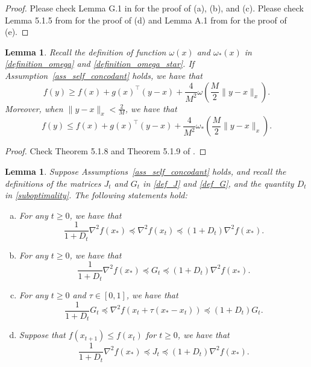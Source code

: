\documentclass[11pt,letterpaper]{article}
\newcommand\0{{\Vector{0}}}
\newcommand\1{{\Vector{1}}}
\newtheorem{lemma}[theorem]{Lemma}
\numberwithin{assumption}{section}
\numberwithin{definition}{section}
\numberwithin{theorem}{section}
\numberwithin{remark}{section}
\begin{document}
\begin{proof}
    Please check Lemma G.1 in \cite{qiujiang2024quasinewton} for the proof of (a), (b), and (c). Please check Lemma 5.1.5 from \cite{convexlecture} for the proof of (d) and Lemma A.1 from \cite{antonglobal} for the proof of (e).
\end{proof}

\begin{lemma}\label{lemma_concordance}
    Recall the definition of function $\omega(x)$ and $\omega_*(x)$ in \eqref{definition_omega} and \eqref{definition_omega_star}. If Assumption~\ref{ass_self_concodant} holds, we have that
    \begin{equation}
        f(y) \geq f(x) + g(x)^\top(y - x) + \frac{4}{M^2}\omega(\frac{M}{2}\|y - x\|_x).
    \end{equation}
    Moreover, when $\|y - x\|_x < \frac{2}{M}$, we have that
    \begin{equation}
        f(y) \leq f(x) + g(x)^\top(y - x) + \frac{4}{M^2}\omega_{*}(\frac{M}{2}\|y - x\|_x).
    \end{equation}
\end{lemma}

\begin{proof}
    Check Theorem 5.1.8 and Theorem 5.1.9 of \cite{convexlecture}.
\end{proof}

\begin{lemma}\label{lemma_Hessian}
    Suppose Assumptions~\ref{ass_self_concodant} holds, and recall the definitions of the matrices $J_t$ and $G_t$ in \eqref{def_J} and \eqref{def_G}, and the quantity $D_t$ in \eqref{suboptimality}. The following statements hold: 
    \begin{enumerate}[(a)]
        \item For any $t \geq 0$, we have that
        \begin{equation}\label{eq:H_t_vs_H*}
            \frac{1}{1 + D_t}\nabla^2{f(x_*)} \preceq \nabla^2{f(x_t)} \preceq (1 + D_t)\nabla^2{f(x_*)} .
        \end{equation}
        \item For any $t \geq 0$, we have that
        \begin{equation}\label{eq:G_t_vs_H*}
            \frac{1}{1 + D_t}\nabla^2{f(x_*)} \preceq G_t \preceq (1 + D_t)\nabla^2{f(x_*)} .
        \end{equation}
        \item For any $t \geq 0$ and $\tau \in [0, 1]$, we have that
        \begin{equation}\label{eq:G_t_vs_H_t}
            \frac{1}{1 + D_t}G_t \preceq \nabla^2{f(x_t + \tau(x_* - x_t))} \preceq (1 + D_t)G_t .
        \end{equation}
        \item Suppose that $f(x_{t + 1}) \leq f(x_t)$ for $t \geq 0$, we have that
        \begin{equation}\label{eq:J_t_vs_H*}
            \frac{1}{1 + D_t}\nabla^2{f(x_*)} \preceq J_t \preceq (1 + D_t)\nabla^2{f(x_*)} .
        \end{equation}
    \end{enumerate}
\end{lemma}
\end{document}
